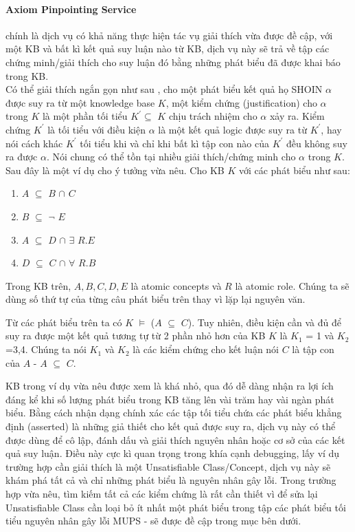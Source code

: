 		\paragraph{Axiom Pinpointing Service} chính là dịch vụ có khả năng thực hiện tác vụ giải thích vừa được đề cập, với một KB và bất kì kết quả suy luận nào từ KB, dịch vụ này sẽ trả về tập các chứng minh/giải thích cho suy luận đó bằng những phát biểu đã được khai báo trong KB.
		\\
		\hspace*{0.05\textwidth} Có thể giải thích ngắn gọn như sau \cite[p.~2]{axiomPinpoint}, cho một phát biểu kết quả họ SHOIN $\alpha$ được suy ra từ một knowledge base $K$, một kiểm chứng (justification) cho $\alpha$  trong $K$ là một phần tối tiểu $K^{'}\subseteq$ $K$ chịu trách nhiệm cho $\alpha$ xảy ra. Kiểm chứng $K^{'}$ là tối tiểu với điều kiện $\alpha$ là một kết quả logic được suy ra từ $K^{'}$, hay nói cách khác $K^{'}$ tối tiểu khi và chỉ khi bất kì tập con nào của $K^{'}$ đều không suy ra được $\alpha$. Nói chung có thể tồn tại nhiều giải thích/chứng minh cho $\alpha$ trong $K$. Sau đây là một ví dụ cho ý tưởng vừa nêu. Cho KB $K$ với các phát biểu như sau:
		\begin{enumerate}
			\item	$A$ $\subseteq$ $B$ $\cap$ $C$ 
			\item	$B$ $\subseteq$ $\neg$ $E$
			\item	$A$ $\subseteq$ $D$ $\cap$ $\exists$ $R.E$ 
			\item	$D$ $\subseteq$ $C$ $\cap$ $\forall$ $R.B$
		\end{enumerate}
		
		Trong KB trên, $A, B, C, D, E$ là atomic concepts và $R$ là atomic role.  Chúng ta sẽ dùng số thứ tự của từng câu phát biểu trên thay vì lặp lại nguyên văn.
		
		\hspace*{0.05\textwidth} Từ các phát biểu trên ta có $K$ $\models$ ($A$ $\subseteq$ $C$). Tuy nhiên, điều kiện cần và đủ để suy ra được một kết quả tương tự từ 2 phần nhỏ hơn của KB $K$ là $K_{1}$ = {1} và $K_{2}$ ={3,4}. Chúng ta nói $K_{1}$ và $K_{2}$ là các kiểm chứng cho kết luận nói $C$ là tập con của $A$ - $A$ $\subseteq$ $C$.
		
		\hspace*{0.05\textwidth} KB trong ví dụ vừa nêu được xem là khá nhỏ, qua đó dễ dàng nhận ra lợi ích đáng kể khi số lượng phát biểu trong KB tăng lên vài trăm hay vài ngàn phát biểu. Bằng cách nhận dạng chính xác các tập tối tiểu chứa các phát biểu khẳng định (asserted) là những giả thiết cho kết quả được suy ra, dịch vụ này có thể được dùng để cô lập, đánh dấu và giải thích nguyên nhân hoặc cơ sở của các kết quả suy luận. Điều này cực kì quan trọng trong khía cạnh debugging, lấy ví dụ trường hợp cần giải thích là một Unsatisfiable Class/Concept, dịch vụ này sẽ khám phá tất cả và chỉ những phát biểu là nguyên nhân gây lỗi. Trong trường hợp vừa nêu, tìm kiếm tất cả các kiểm chứng là rất cần thiết vì để sửa lại Unsatisfiable Class cần loại bỏ ít nhất một phát biểu trong tập các phát biểu tối tiểu nguyên nhân gây lỗi MUPS - sẽ được đề cập trong mục bên dưới.
		
